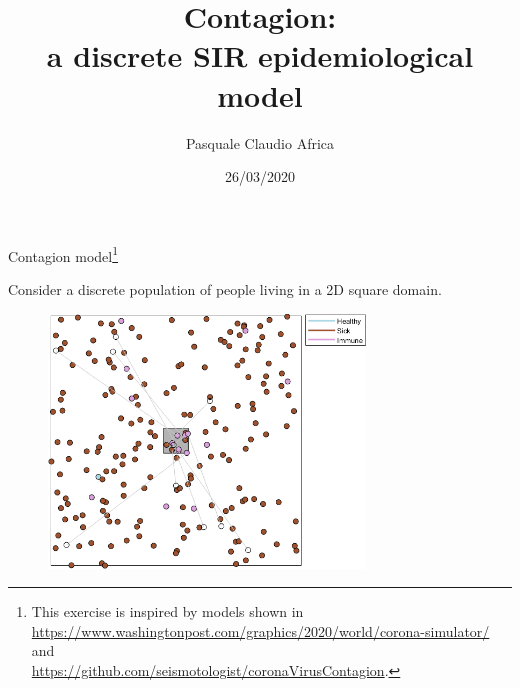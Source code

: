 \documentclass[10pt]{beamer}
\begin{document}
    \title{Contagion:\\a discrete SIR epidemiological model}
    \author{Pasquale Claudio Africa}
    \date{26/03/2020}
    
\begin{frame}
    \maketitle
\end{frame}

\begin{frame}{Contagion model\footnote{This exercise is inspired by models shown in \\
\url{https://www.washingtonpost.com/graphics/2020/world/corona-simulator/} and \\
\url{https://github.com/seismotologist/coronaVirusContagion}.}}

Consider a discrete population of people living in a 2D square domain.

\begin{figure}
    \includegraphics[width=0.75\textwidth]{contagion.png}
\end{figure}
\end{frame}
\end{document}
